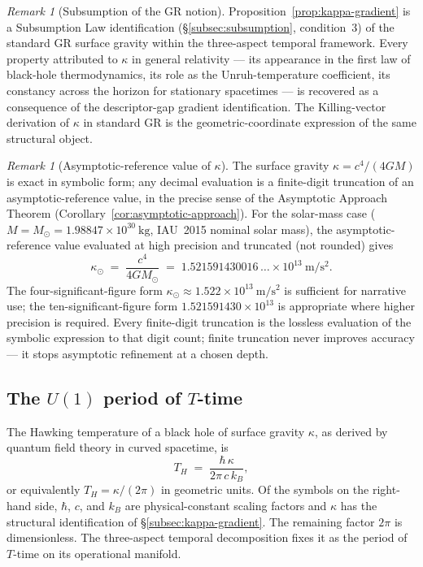 \documentclass[11pt,a4paper]{article}
\theoremstyle{definition}
\theoremstyle{remark}
\newtheorem{remark}[theorem]{Remark}
\begin{document}
\begin{remark}[Subsumption of the GR notion]\label{rem:kappa-subsumption}
Proposition~\ref{prop:kappa-gradient} is a Subsumption Law identification (\S\ref{subsec:subsumption}, condition~3) of the standard GR surface gravity within the three-aspect temporal framework. Every property attributed to $\kappa$ in general relativity --- its appearance in the first law of black-hole thermodynamics, its role as the Unruh-temperature coefficient, its constancy across the horizon for stationary spacetimes --- is recovered as a consequence of the descriptor-gap gradient identification. The Killing-vector derivation of $\kappa$ in standard GR is the geometric-coordinate expression of the same structural object.
\end{remark}

\begin{remark}[Asymptotic-reference value of $\kappa$]\label{rem:kappa-asymptotic}
The surface gravity $\kappa = c^{4}/(4GM)$ is exact in symbolic form; any decimal evaluation is a finite-digit truncation of an asymptotic-reference value, in the precise sense of the Asymptotic Approach Theorem (Corollary~\ref{cor:asymptotic-approach}). For the solar-mass case ($M = M_{\odot} = 1.98847\times 10^{30}~\text{kg}$, IAU~2015 nominal solar mass), the asymptotic-reference value evaluated at high precision and truncated (not rounded) gives
\[
\kappa_{\odot} \;=\; \frac{c^{4}}{4 G M_{\odot}} \;=\; 1.521591430016\,\ldots \times 10^{13}~\text{m}/\text{s}^{2}.
\]
The four-significant-figure form $\kappa_{\odot} \approx 1.522 \times 10^{13}~\text{m}/\text{s}^{2}$ is sufficient for narrative use; the ten-significant-figure form $1.521591430 \times 10^{13}$ is appropriate where higher precision is required. Every finite-digit truncation is the lossless evaluation of the symbolic expression to that digit count; finite truncation never improves accuracy --- it stops asymptotic refinement at a chosen depth.
\end{remark}

\subsection{The $U(1)$ period of $T$-time}\label{subsec:U1-period}

The Hawking temperature of a black hole of surface gravity $\kappa$, as derived by quantum field theory in curved spacetime, is
\begin{equation}\label{eq:T_H}
T_{H} \;=\; \frac{\hbar\,\kappa}{2\pi\,c\,k_{B}},
\end{equation}
or equivalently $T_{H} = \kappa/(2\pi)$ in geometric units. Of the symbols on the right-hand side, $\hbar$, $c$, and $k_{B}$ are physical-constant scaling factors and $\kappa$ has the structural identification of \S\ref{subsec:kappa-gradient}. The remaining factor $2\pi$ is dimensionless. The three-aspect temporal decomposition fixes it as the period of $T$-time on its operational manifold.
\end{document}
